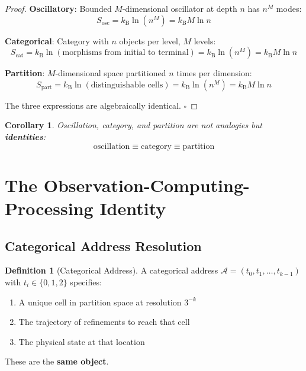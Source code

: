 \documentclass[12pt,a4paper]{article}
\newtheorem{corollary}[theorem]{Corollary}
\theoremstyle{definition}
\newtheorem{definition}[theorem]{Definition}
\theoremstyle{remark}
\newcommand{\kB}{k_{\mathrm{B}}}
\begin{document}
\begin{proof}
\textbf{Oscillatory}: Bounded $M$-dimensional oscillator at depth $n$ has $n^M$ modes:
\begin{equation}
S_{\text{osc}} = \kB \ln(n^M) = \kB M \ln n
\end{equation}

\textbf{Categorical}: Category with $n$ objects per level, $M$ levels:
\begin{equation}
S_{\text{cat}} = \kB \ln(\text{morphisms from initial to terminal}) = \kB \ln(n^M) = \kB M \ln n
\end{equation}

\textbf{Partition}: $M$-dimensional space partitioned $n$ times per dimension:
\begin{equation}
S_{\text{part}} = \kB \ln(\text{distinguishable cells}) = \kB \ln(n^M) = \kB M \ln n
\end{equation}

The three expressions are algebraically identical. $\square$
\end{proof}

\begin{corollary}
Oscillation, category, and partition are not analogies but \textbf{identities}:
\begin{equation}
\text{oscillation} \equiv \text{category} \equiv \text{partition}
\end{equation}
\end{corollary}

\section{The Observation-Computing-Processing Identity}
\label{sec:identity}

\subsection{Categorical Address Resolution}

\begin{definition}[Categorical Address]
A categorical address $\mathcal{A} = (t_0, t_1, \ldots, t_{k-1})$ with $t_i \in \{0, 1, 2\}$ specifies:
\begin{enumerate}
    \item A unique cell in partition space at resolution $3^{-k}$
    \item The trajectory of refinements to reach that cell
    \item The physical state at that location
\end{enumerate}
These are the \textbf{same object}.
\end{definition}
\end{document}
